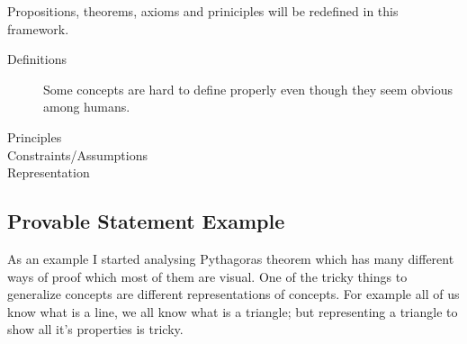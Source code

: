 \documentclass{article}
\begin{document}
Propositions, theorems, axioms and priniciples will be redefined in this framework.

\begin{description}
\item[Definitions]
Some concepts are hard to define properly even though they seem obvious among humans. 
\item[Principles]
 
\item[Constraints/Assumptions]

\item[Representation]


\end{description} 
 


\subsection*{Provable Statement Example}

As an example I started analysing Pythagoras theorem which has many different ways of proof which most of them are visual. One of the tricky things to generalize concepts are different representations of concepts. For example all of us know what is a line, we all know what is a triangle; but representing a triangle to show all it's properties is tricky.






% 

% 

\end{document}
